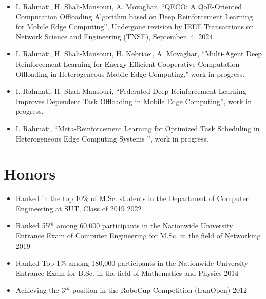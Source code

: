 \documentclass[11pt]{article}
\begin{document}
  \begin{itemize}
  	
  	\item I. Rahmati, H. Shah-Mansouri, A. Movaghar, ``QECO: A QoE-Oriented Computation Offloading Algorithm based on Deep Reinforcement Learning for Mobile Edge Computing'', Undergone revision by IEEE Transactions on Network Science and Engineering (TNSE), September. 4. 2024.
  	\href{https://arxiv.org/pdf/2311.02525}{\small  \faExternalLink}
  	\href{https://github.com/ImanRHT/QECO}{\faGithub}
  	
  	
  	\item I. Rahmati, H. Shah-Mansouri, H. Kebriaei, A. Movaghar, ``Multi-Agent Deep Reinforcement Learning for Energy-Efficient Cooperative Computation Offloading in Heterogeneous Mobile Edge Computing," work in progress. \href{https://imanrht.github.io/assets/Multi_AgentDRL.pdf}{\small  \faExternalLink}
  	
  	\item I. Rahmati, H. Shah-Mansouri, ``Federated Deep Reinforcement Learning Improves Dependent Task Offloading in Mobile Edge Computing'', work in progress.  \href{https://imanrht.github.io/assets/FederatedDRL.pdf}{\small  \faExternalLink}
  	
  	\item I. Rahmati, ``Meta-Reinforcement Learning for Optimized Task Scheduling in Heterogeneous Edge Computing Systems
  	'', work in progress.  \href{https://imanrht.github.io/assets/MetaRL.pdf}{\small  \faExternalLink}
  	
  	


		

  \end{itemize}

\section{Honors}
\begin{itemize}
	\renewcommand\labelitemi{\ding{118}}
	\item{Ranked in the top 10\% of M.Sc. students in the Department of Computer Engineering at SUT, Class of 2019  \hfill  2022}\vspace{-2mm}
	\item {Ranked 55$^{th}$ among 60,000 participants in the Nationwide University Entrance Exam of Computer Engineering for M.Sc. in the field of Networking \hfill  2019}\vspace{-2mm}
	\item{Ranked Top 1\% among 180,000 participants in the Nationwide University Entrance Exam for B.Sc. in the field of Mathematics and Physics  \hfill  2014}\vspace{-2mm}
	\item{Achieving the 3$^{th}$ position in the RoboCup Competition (IranOpen)  \hfill  2012}\vspace{-2mm}
\end{itemize}
\end{document}
